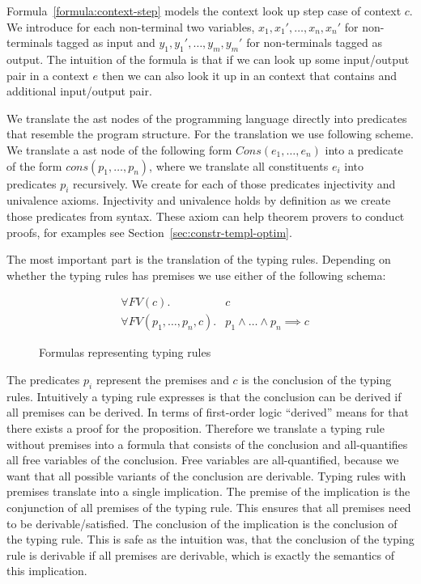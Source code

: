 Formula~\ref{formula:context-step} models the context look up step
case of context $c$. We introduce for each non-terminal two variables,
$x_1,x_1', \dots, x_n,x_n'$ for non-terminals tagged as input and
$y_1,y_1', \dots, y_m,y_m'$ for non-terminals tagged as output. The
intuition of the formula is that if we can look up some input/output
pair in a context $e$ then we can also look it up in an context that
contains and additional input/output pair.

We translate the \gls{ast} nodes of the programming language directly
into predicates that resemble the program structure. For the
translation we use following scheme. We translate a \gls{ast} node of
the following form $Cons(e_1, \dots, e_n)$ into a predicate of the
form $cons(p_1, \dots, p_n)$, where we translate all constituents
$e_i$ into predicates $p_i$ recursively. We create for each of those
predicates injectivity and univalence axioms. Injectivity and
univalence holds by definition as we create those predicates from
syntax. These axiom can help theorem provers to conduct proofs, for
examples see Section~\ref{sec:constr-templ-optim}.

The most important part is the translation of the typing
rules. Depending on whether the typing rules has premises we use
either of the following schema:

\begin{figure}
\begin{align}
  &\forall FV(c) .& c \\
  &\forall FV(p_1,\dots, p_n, c) .& p_1 \land \dots \land p_n \implies
  c
\label{formula:typing-rule}
\end{align}
\caption{Formulas representing typing rules}
\end{figure}

The predicates $p_i$ represent the premises and $c$ is the conclusion
of the typing rules. Intuitively a typing rule expresses is that the
conclusion can be derived if all premises can be derived. In terms of
first-order logic ``derived'' means for that there exists a proof for
the proposition. Therefore we translate a typing rule without premises
into a formula that consists of the conclusion and all-quantifies all
free variables of the conclusion. Free variables are all-quantified,
because we want that all possible variants of the conclusion are
derivable. Typing rules with premises translate into a single implication. The
premise of the implication is the conjunction of all premises of the
typing rule. This ensures that all premises need to be
derivable/satisfied. The conclusion of the implication is the
conclusion of the typing rule. This is safe as the intuition was, that
the conclusion of the typing rule is derivable if all premises are
derivable, which is exactly the semantics of this implication.

